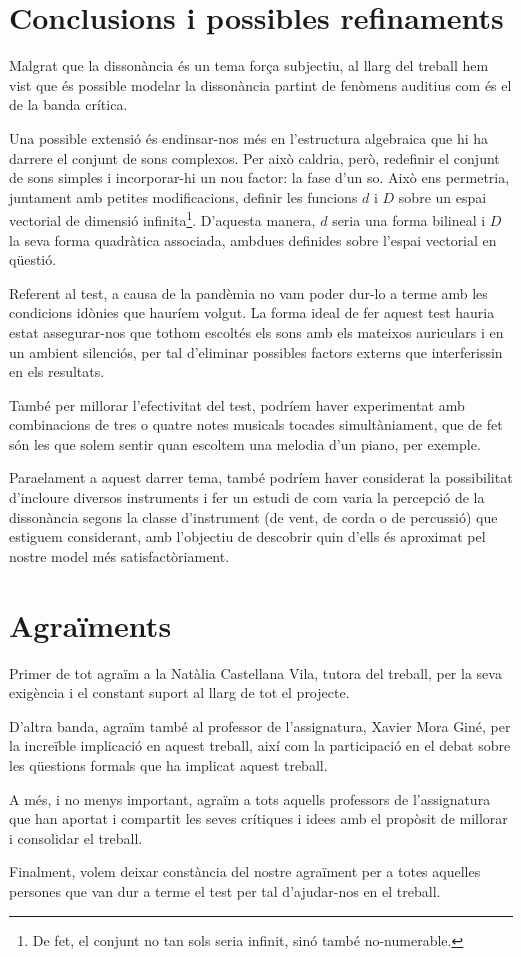 \documentclass{article}
\theoremstyle{math}
\theoremstyle{TheoremNum}
\newcommand{\0}{\ensuremath{\vb{0}}}
\begin{document}
\section{Conclusions i possibles refinaments}
Malgrat que la dissonància és un tema força subjectiu, al llarg del treball hem vist que és possible modelar la dissonància partint de fenòmens auditius com és el de la banda crítica.\par
Una possible extensió és endinsar-nos més en l'estructura algebraica que hi ha darrere el conjunt de sons complexos. Per això caldria, però, redefinir el conjunt de sons simples i incorporar-hi un nou factor: la fase d'un so. Això ens permetria, juntament amb petites modificacions, definir les funcions $d$ i $D$ sobre un espai vectorial de dimensió infinita\footnote{De fet, el conjunt no tan sols seria infinit, sinó també no-numerable.}. D'aquesta manera, $d$ seria una forma bilineal i $D$ la seva forma quadràtica associada, ambdues definides sobre l'espai vectorial en qüestió.\par
Referent al test, a causa de la pandèmia no vam poder dur-lo a terme amb les condicions idònies que hauríem volgut. La forma ideal de fer aquest test hauria estat assegurar-nos que tothom escoltés els sons amb els mateixos auriculars i en un ambient silenciós, per tal d'eliminar possibles factors externs que interferissin en els resultats.\par
També per millorar l'efectivitat del test, podríem haver experimentat amb combinacions de tres o quatre notes musicals tocades simultàniament, que de fet són les que solem sentir quan escoltem una melodia d'un piano, per exemple. \par Para\lgem elament a aquest darrer tema, també podríem haver considerat la possibilitat d'incloure diversos instruments i fer un estudi de com varia la percepció de la dissonància segons la classe d'instrument (de vent, de corda o de percussió) que estiguem considerant, amb l'objectiu de descobrir quin d'ells és aproximat pel nostre model més satisfactòriament.
\section{Agraïments}
Primer de tot agraïm a la Natàlia Castellana Vila, tutora del treball, per la seva exigència i el constant suport al llarg de tot el projecte. \par
D'altra banda, agraïm també al professor de l'assignatura, Xavier Mora Giné, per la increïble implicació en aquest treball, així com la participació en el debat sobre les qüestions formals que ha implicat aquest treball.\par 
A més, i no menys important, agraïm a tots aquells professors de l'assignatura que han aportat i compartit les seves crítiques i idees amb el propòsit de millorar i consolidar el treball.\par
Finalment, volem deixar constància del nostre agraïment per a totes aquelles persones que van dur a terme el test per tal d'ajudar-nos en el treball.
\printbibliography[heading=bibintoc]
\appendix
\end{document}

